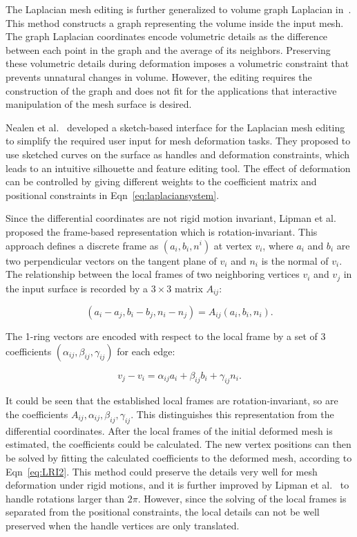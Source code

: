 The Laplacian mesh editing is further generalized to volume graph Laplacian in~\cite{ZHSLBGS05}. This method constructs a graph representing the volume inside the input mesh. The graph Laplacian coordinates encode volumetric details as the difference between each point in the graph and the average of its neighbors. Preserving these volumetric details during deformation imposes a volumetric constraint that prevents unnatural changes in volume. However, the editing requires the construction of the graph and does not fit for the applications that interactive manipulation of the mesh surface is desired.

Nealen et al.~\cite{NSAC05} developed a sketch-based interface for the Laplacian mesh editing to simplify the required user input for mesh deformation tasks. They proposed to use sketched curves on the surface as handles and deformation constraints, which leads to an intuitive silhouette and feature editing tool. The effect of deformation can be controlled by giving different weights to the coefficient matrix and positional constraints in Eqn~\ref{eq:laplaciansystem}.

Since the differential coordinates are not rigid motion invariant, Lipman et al.~\cite{LSLC05} proposed the frame-based representation which is rotation-invariant. This approach defines a discrete frame as $(a_i,b_i,n^i)$ at vertex $v_i$, where $a_i$ and $b_i$ are two perpendicular vectors on the tangent plane of $v_i$ and $n_i$ is the normal of $v_i$. The relationship between the local frames of two neighboring vertices $v_i$ and $v_j$ in the input surface is recorded by a $3\times3$ matrix $A_{ij}$:

\begin{equation}
\label{eq:LRI1}
(a_i-a_j,b_i-b_j,n_i-n_j) = A_{ij} (a_i,b_i,n_i).
\end{equation}

The 1-ring vectors are encoded with respect to the local frame by a set of 3 coefficients $(\alpha_{ij},\beta_{ij},\gamma_{ij})$ for each edge:

\begin{equation}
\label{eq:LRI2}
v_j-v_i=\alpha_{ij}a_i+\beta_{ij}b_i+\gamma_{ij}n_i .
\end{equation}

It could be seen that the established local frames are rotation-invariant, so are the coefficients $A_{ij},\alpha_{ij},\beta_{ij},\gamma_{ij}$. This distinguishes this representation from the differential coordinates. After the local frames of the initial deformed mesh is estimated, the coefficients could be calculated. The new vertex positions can then be solved by fitting the calculated coefficients to the deformed mesh, according to Eqn~\ref{eq:LRI2}. This method could preserve the details very well for mesh deformation under rigid motions, and it is further improved by Lipman et al.~\cite{LCGL07} to handle rotations larger than $2\pi$. However, since the solving of the local frames is separated from the positional constraints, the local details can not be well preserved when the handle vertices are only translated.

